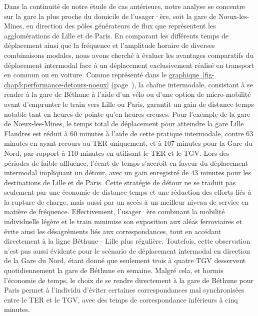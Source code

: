 \begin{refsegment}
Dans la continuité de notre étude de cas antérieure, notre analyse se concentre sur la gare la plus proche du domicile de l'usager·ère, soit la gare de Nœux-les-Mines, en direction des pôles générateurs de flux que représentent les agglomérations de Lille et de Paris. En comparant les différents temps de déplacement ainsi que la fréquence et l'amplitude horaire de diverses combinaisons modales, nous avons cherché à évaluer les avantages comparatifs du déplacement intermodal face à un déplacement exclusivement réalisé en transport en commun ou en voiture. Comme représenté dans le \hyperref[fig-chap5:performance-detours-noeux]{graphique~\ref{fig-chap5:performance-detours-noeux}} (page~\pageref{fig-chap5:performance-detours-noeux}), la chaîne intermodale, consistant à se rendre à la gare de Béthune à l'aide d'un vélo ou d'une option de micro-mobilité avant d'emprunter le train vers Lille ou Paris, garantit un gain de distance-temps notable tant en heures de pointe qu'en heures creuses. Pour l'exemple de la gare de Nœux-les-Mines, le temps total de déplacement pour atteindre la gare Lille Flandres est réduit à 60 minutes à l'aide de cette pratique intermodale, contre 63 minutes en ayant recours au \acrshort{TER} uniquement, et à 107 minutes pour la Gare du Nord, par rapport à 110 minutes en utilisant le \acrshort{TER} et le \acrshort{TGV}. Lors des périodes de faible affluence, l'écart de temps s'accroît en faveur du déplacement intermodal impliquant un détour, avec un gain enregistré de 43 minutes pour les destinations de Lille et de Paris. Cette stratégie de détour ne se traduit pas seulement par une économie de distance-temps et une réduction des efforts liés à la rupture de charge, mais aussi par un accès à un meilleur niveau de service en matière de fréquence. Effectivement, l'usager·ère combinant la mobilité individuelle légère et le train minimise son exposition aux aléas ferroviaires et évite ainsi les désagréments liés aux correspondances, tout en accédant directement à la ligne Béthune - Lille plus régulière. Toutefois, cette observation n'est pas aussi évidente pour le scénario de déplacement intermodal en direction de la Gare du Nord, étant donné que seulement trois à quatre \acrshort{TGV} desservent quotidiennement la gare de Béthune en semaine. Malgré cela, et hormis l'économie de temps, le choix de se rendre directement à la gare de Béthune pour Paris permet à l'individu d'éviter certaines correspondances mal synchronisées entre le \acrshort{TER} et le \acrshort{TGV}, avec des temps de correspondance inférieurs à cinq minutes.%


\end{refsegment}

